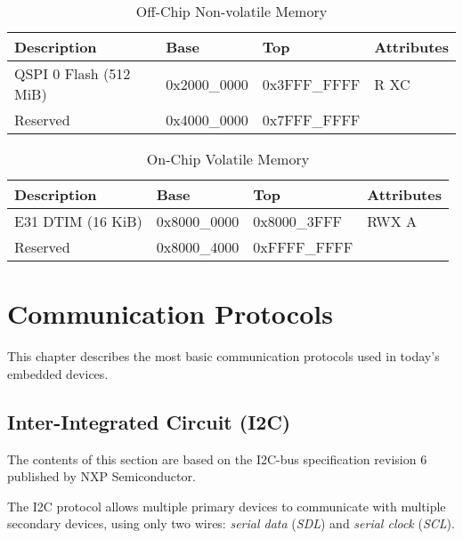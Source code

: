 \documentclass[a4paper,12pt,twoside]{report}
\begin{document}
            	\begin{table}[H]
            		\centering
            		\begin{tabular}{| p{4.5cm} | p{3cm} | p{3cm} | p{2.5cm} |}
            			\hline
            			\textbf{Description} & \textbf{Base} & \textbf{Top} & \textbf{Attributes}\\
            			\hline
            			\hline
            			QSPI 0 Flash (512 MiB) & 0x2000\_0000 & 0x3FFF\_FFFF & R XC\\
            			Reserved & 0x4000\_0000 & 0x7FFF\_FFFF & \\
            			\hline
            		\end{tabular}
            		\caption{Off-Chip Non-volatile Memory}
            	\end{table}

            	\begin{table}[H]
            		\centering
            		\begin{tabular}{| p{4.5cm} | p{3cm} | p{3cm} | p{2.5cm} |}
            			\hline
            			\textbf{Description} & \textbf{Base} & \textbf{Top} & \textbf{Attributes}\\
            			\hline
            			\hline
            			E31 DTIM (16 KiB) & 0x8000\_0000 & 0x8000\_3FFF & RWX A\\
            			Reserved & 0x8000\_4000 & 0xFFFF\_FFFF & \\
            			\hline
            		\end{tabular}
            		\caption{On-Chip Volatile Memory}
            	\end{table}
        \chapter{Communication Protocols}
            This chapter describes the most basic communication protocols used in today's embedded devices.

            \section{Inter-Integrated Circuit (I2C)}
                The contents of this section are based on the I2C-bus specification revision 6 published by NXP Semiconductor\cite{i2cBusSpec}.

                The I2C protocol allows multiple primary devices to communicate with multiple secondary devices, using only two wires: \textit{serial data} (\textit{SDL}) and \textit{serial clock} (\textit{SCL}).
\end{document}
